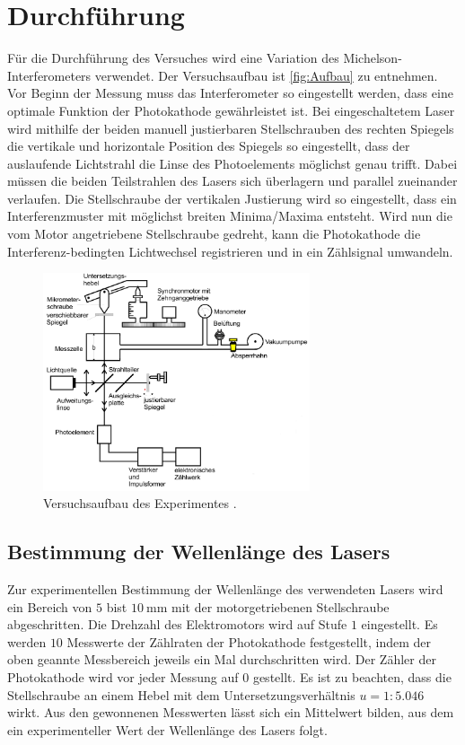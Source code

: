 \section{Durchführung}
\label{sec:Durchführung}
Für die Durchführung des Versuches wird eine Variation des Michelson-Interferometers verwendet. Der Versuchsaufbau ist \autoref{fig:Aufbau} zu entnehmen.
Vor Beginn der Messung muss das Interferometer so eingestellt werden, dass eine optimale Funktion der Photokathode gewährleistet ist.
Bei eingeschaltetem Laser wird mithilfe der beiden manuell justierbaren Stellschrauben des rechten Spiegels die vertikale und horizontale
Position des Spiegels so eingestellt, dass der auslaufende Lichtstrahl die Linse des Photoelements möglichst genau trifft. Dabei müssen die beiden Teilstrahlen
des Lasers sich überlagern und parallel zueinander verlaufen. Die Stellschraube der vertikalen Justierung wird so eingestellt, dass ein Interferenzmuster
mit möglichst breiten Minima/Maxima entsteht. Wird nun die vom Motor angetriebene Stellschraube gedreht, kann die Photokathode die Interferenz-bedingten
Lichtwechsel registrieren und in ein Zählsignal umwandeln.

\begin{figure}
    \centering
    \includegraphics[width = 0.7\textwidth]{content/Aufbau.png}
    \caption{Versuchsaufbau des Experimentes \cite{v401}.}
    \label{fig:Aufbau}
\end{figure}

\subsection{Bestimmung der Wellenlänge des Lasers}
\label{subsec:Laser_Wellenlaenge}
Zur experimentellen Bestimmung der Wellenlänge des verwendeten Lasers wird ein Bereich von $5$ bist $\qty{10}{\milli\metre}$ mit der motorgetriebenen Stellschraube 
abgeschritten. Die Drehzahl des Elektromotors wird auf Stufe $1$ eingestellt. Es werden $10$ Messwerte der Zählraten der Photokathode festgestellt, indem
der oben geannte Messbereich jeweils ein Mal durchschritten wird. Der Zähler der Photokathode wird vor jeder Messung auf $0$ gestellt.
Es ist zu beachten, dass die Stellschraube an einem Hebel mit dem Untersetzungsverhältnis $u = 1:5.046$ wirkt. 
Aus den gewonnenen Messwerten lässt sich ein Mittelwert bilden, aus dem ein experimenteller Wert der Wellenlänge des Lasers folgt.

